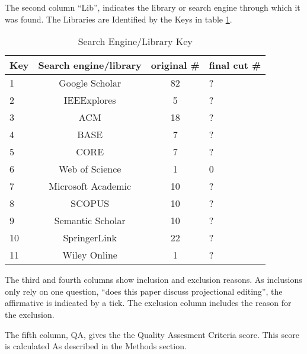The second column ``Lib'', indicates the library or search engine through which it was found.  
The Libraries are Identified by the Keys in table \ref{table:SearchEngineKey}.
\begin{table}[h]
    \begin{center}
        \begin{tabular}{ |l | c | c | l| } 
            \hline
            Key & Search engine/library     & original \# & final cut \#      \\
            \hline
            \hline
            1  & Google Scholar             & 82          & ?                 \\
            2  & IEEExplores                & 5           & ?                 \\
            3  & ACM                        & 18          & ?                 \\
            4  & BASE                       & 7           & ?                 \\
            5  & CORE                       & 7           & ?                 \\
            6  & Web of Science             & 1           & 0                 \\
            7  & Microsoft Academic         & 10          & ?                 \\
            8  & SCOPUS                     & 10          & ?                 \\
            9  & Semantic Scholar           & 10          & ?                 \\
            10 & SpringerLink               & 22          & ?                 \\
            11 & Wiley Online               & 1           & ?                 \\
            \hline
        \end{tabular}
    \end{center}
    \caption{Search Engine/Library Key}
    \label{table:SearchEngineKey}
\end{table}

The third and fourth columns show inclusion and exclusion reasons.
As inclusions only rely on one question, ``does this paper discuss projectional editing'', the affirmative is indicated by a tick.
The exclusion column includes the reason for  the exclusion.

The fifth column, QA, gives the the Quality Assesment Criteria score.
This score is calculated As described in the Methods section.

